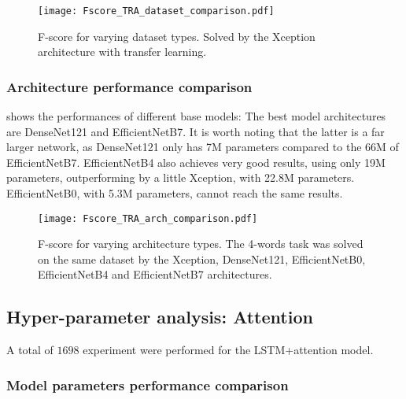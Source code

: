 \begin{figure}[h!]
    \centering
    \texttt{[image: Fscore\_TRA\_dataset\_comparison.pdf]}
    \caption{F-score for varying
        dataset types.
        Solved by the Xception architecture with transfer learning.
    }%
    \label{fig:tra_comparison_dataset}
\end{figure}

\subsubsection{Architecture performance comparison}


 shows the performances of different base models:
The best model architectures are DenseNet121 and EfficientNetB7.
It is worth noting that the latter is a far larger network, as DenseNet121 only
has 7M parameters compared to the 66M of EfficientNetB7.
EfficientNetB4 also achieves very good results, using only 19M parameters,
outperforming by a little Xception, with 22.8M parameters.
EfficientNetB0, with 5.3M parameters, cannot reach the same results.



\begin{figure}[h!]
    \centering
    \texttt{[image: Fscore\_TRA\_arch\_comparison.pdf]}
    \caption{F-score for varying
        architecture types.
        The 4-words task was solved on the same dataset by the 
        Xception, DenseNet121, EfficientNetB0, EfficientNetB4 and
        EfficientNetB7 architectures.
    }%
    \label{fig:tra_comparison_arch}
\end{figure}

\subsection{Hyper-parameter analysis: Attention}

A total of $1698$ experiment were performed for the LSTM+attention model.

\subsubsection{Model parameters performance comparison}

